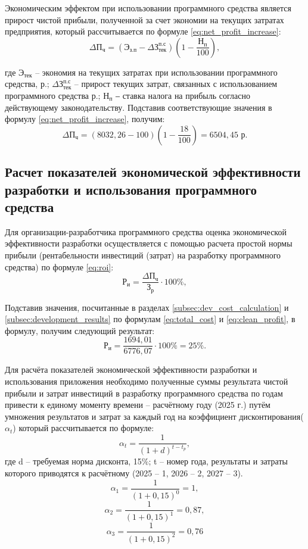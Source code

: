 Экономическим эффектом при использовании программного средства является прирост чистой прибыли, полученной за счет экономии на текущих затратах предприятия, который рассчитывается по формуле \ref{eq:net_profit_increase}:
\begin{equation}
	\label{eq:net_profit_increase}
	\Delta \mathrm{П_{ч}} = (\mathrm{Э_{з.п}} - \Delta \text{З}_\text{тек}^{\text{п.с}}) \left( 1 - \frac{\mathrm{Н_{п}}}{100} \right),
\end{equation}

где $\mathrm{Э_{тек}}$ – экономия на текущих затратах при использовании программного средства, р.; $\Delta \text{З}_\text{тек}^{\text{п.с}}$ – прирост текущих затрат, связанных с использованием программного средства р.; $\mathrm{Н_{п}}$ ‒ ставка налога на прибыль согласно действующему законодательству. Подставив соответствующие значения в формулу \ref{eq:net_profit_increase}, получим:
\[
\Delta \mathrm{П_{ч}} = (8032{,}26 - 100) \left(1 - \frac{18}{100}\right) = 6504{,}45 \text{ р}.
\]

\subsection{Расчет показателей экономической эффективности разработки и использования программного средства} 

Для организации-разработчика программного средства оценка экономической эффективности разработки осуществляется с помощью расчета простой нормы прибыли (рентабельности инвестиций (затрат) на разработку программного средства) по формуле \ref{eq:roi}:
\begin{equation}
	\label{eq:roi}
	\mathrm{Р_{и}} = \frac{\Delta \mathrm{П_{ч}}}{\mathrm{З_{р}}} \cdot 100\%,
\end{equation}

Подставив значения, посчитанные в разделах \ref{subsec:dev_cost_calculation} и \ref{subsec:development_results}   по формулам \ref{eq:total_cost} и \ref{eq:clean_profit}, в формулу, получим следующий результат:
\[
\mathrm{Р_{и}} = \frac{1694{,}01}{6776{,}07} \cdot 100\% = 25\%.
\]

Для расчёта показателей экономической эффективности разработки и использования приложения необходимо полученные суммы результата чистой прибыли и затрат инвестиций в разработку программного средства по годам привести к единому моменту времени – расчётному году (2025 г.) путём умножения результатов и затрат за каждый год на коэффициент дисконтирования($\alpha_t$) который рассчитывается по формуле:
\begin{equation}
	\alpha_t = \frac{1}{(1 + d)^{t - t_p}},
\end{equation}
где d – требуемая норма дисконта, 15\%;
t – номер года, результаты и затраты которого приводятся к расчётному (2025 – 1, 2026 – 2, 2027 – 3).
\[
\alpha_1 = \frac{1}{(1+0{,}15)^0} = 1,
\]
\[
\alpha_2 = \frac{1}{(1+0{,}15)^1} = 0{,}87,
\]
\[
\alpha_3 = \frac{1}{(1+0{,}15)^2} = 0{,}76
\]

